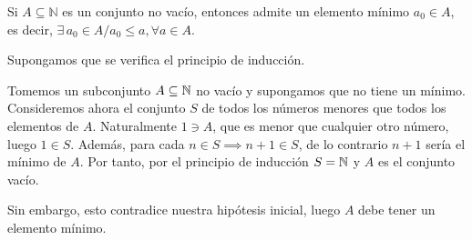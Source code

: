 \begin{fmd-theorem} 
	Si $A \subseteq \mathbb{N}$ es un conjunto no vacío, entonces admite un elemento mínimo $a_0 \in A$, es decir, $\exists \, a_0 \in A / a_0 \le a, \forall a \in A$.
\end{fmd-theorem}

\begin{fmd-proof}
	Supongamos que se verifica el principio de inducción.
	
	Tomemos un subconjunto $A \subseteq \mathbb{N}$ no vacío y supongamos que no tiene un mínimo. Consideremos ahora el conjunto $S$ de todos los números menores que todos los elementos de $A$. Naturalmente $1 \ni A$, que es menor que cualquier otro número, luego $1 \in S$. Además, para cada $n \in S \implies n + 1 \in S$, de lo contrario $n+1$ sería el mínimo de $A$. Por tanto, por el principio de inducción $S = \mathbb{N}$ y $A$ es el conjunto vacío.
	
	Sin embargo, esto contradice nuestra hipótesis inicial, luego $A$ debe tener un elemento mínimo.
\end{fmd-proof}

